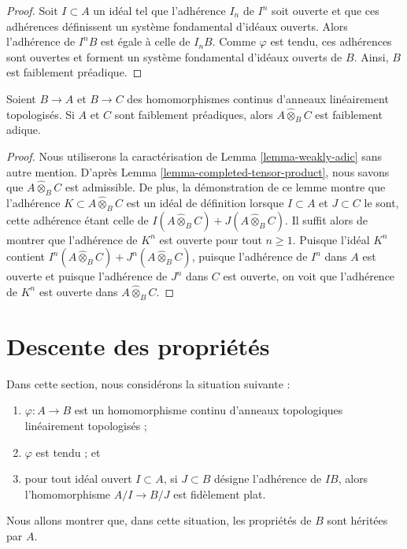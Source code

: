 \begin{proof}
Soit $I \subset A$ un idéal tel que l'adhérence $I_n$ de $I^n$
soit ouverte et que ces adhérences définissent un système fondamental d'idéaux ouverts.
Alors l'adhérence de $I^nB$ est égale à celle de $I_nB$.
Comme $\varphi$ est tendu, ces adhérences sont ouvertes et forment un système fondamental
d'idéaux ouverts de $B$. Ainsi, $B$ est faiblement préadique.
\end{proof}

\begin{lemma}
\label{lemma-completed-tensor-product-weakly-adic}
Soient $B \to A$ et $B \to C$ des homomorphismes continus d'anneaux
linéairement topologisés. Si $A$ et $C$ sont faiblement préadiques, alors
$A \widehat{\otimes}_B C$ est faiblement adique.
\end{lemma}

\begin{proof}
Nous utiliserons la caractérisation de Lemma \ref{lemma-weakly-adic}
sans autre mention. D'après Lemma \ref{lemma-completed-tensor-product},
nous savons que $A \widehat{\otimes}_B C$ est admissible.
De plus, la démonstration de ce lemme montre que
l'adhérence $K \subset A \widehat{\otimes}_B C$
est un idéal de définition lorsque $I \subset A$ et $J \subset C$
le sont, cette adhérence étant celle de $I(A \widehat{\otimes}_B C) + J(A \widehat{\otimes}_B C)$.
Il suffit alors de montrer que
l'adhérence de $K^n$ est ouverte pour tout $n \geq 1$.
Puisque l'idéal $K^n$ contient
$I^n(A \widehat{\otimes}_B C) + J^n(A \widehat{\otimes}_B C)$,
puisque l'adhérence de $I^n$ dans $A$ est ouverte et
puisque l'adhérence de $J^n$ dans $C$ est ouverte, on
voit que l'adhérence de $K^n$ est ouverte dans $A \widehat{\otimes}_B C$.
\end{proof}






\section{Descente des propriétés}
\label{section-taut-descent}

\noindent
Dans cette section, nous considérons la situation suivante :
\begin{enumerate}
\item $\varphi : A \to B$ est un homomorphisme continu d'anneaux
topologiques linéairement topologisés ;
\item $\varphi$ est tendu ; et
\item pour tout idéal ouvert $I \subset A$, si $J \subset B$
désigne l'adhérence de $IB$, alors l'homomorphisme $A/I \to B/J$
est fidèlement plat.
\end{enumerate}
Nous allons montrer que, dans cette situation, les propriétés de $B$ sont héritées
par $A$.

